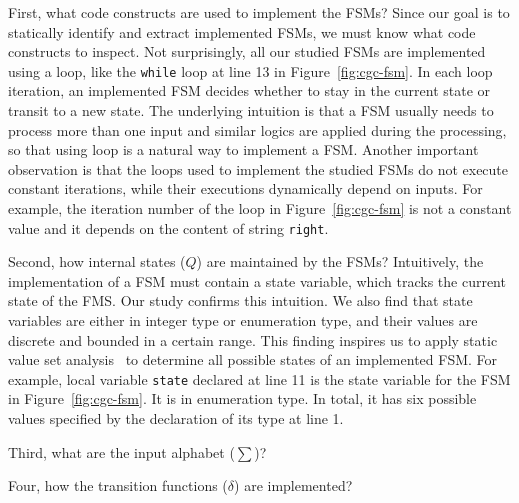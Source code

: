 First, what code constructs are used to implement the FSMs?
Since our goal is to statically identify and extract implemented FSMs, 
we must know what code constructs to inspect. 
Not surprisingly, all our studied FSMs are implemented using a loop, 
like the \texttt{while} loop at line 13 in Figure~\ref{fig:cgc-fsm}.  
In each loop iteration, an implemented FSM 
decides whether to stay in the current state or transit to a new state. 
The underlying intuition is that a FSM usually needs to process 
more than one input and similar logics are applied during the processing, 
so that using loop is a natural way to implement a FSM. 
Another important observation is that 
the loops used to implement the studied FSMs do not execute constant iterations,
while their executions dynamically depend on inputs. 
For example, the iteration number of the loop in Figure~\ref{fig:cgc-fsm}
is not a constant value and it depends on the content of string \texttt{right}.


Second, how internal states ($Q$) are maintained by the FSMs?
Intuitively, the implementation of a FSM must contain a state variable, 
which tracks the current state of the FMS.
Our study confirms this intuition. 
We also find that state variables are either in integer type or enumeration type,
and their values are discrete and bounded in a certain range. 
This finding inspires us to apply static value set analysis~\cite{DEEPVSA,VSA} 
to determine all possible states of an implemented FSM.
For example, local variable \texttt{state} declared at line 11
is the state variable for the FSM in Figure~\ref{fig:cgc-fsm}.
It is in enumeration type.
In total, it has six possible values specified by the declaration of 
its type at line 1. 




Third, what are the input alphabet ($\sum$)? 

Four, how the transition functions ($\delta$) are implemented?

